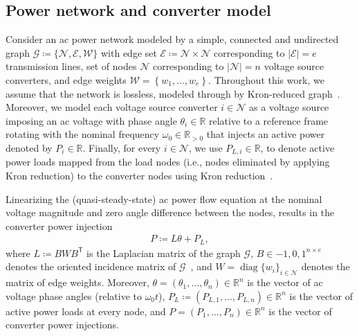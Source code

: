 \documentclass[twocolumn,twoside,journal]{IEEEtran}
\DeclareMathOperator{\diag}{diag}
\newcommand{\mc}{\mathcal}
\begin{document}
    \subsection{Power network and converter model}
    Consider an ac power network modeled by a simple, connected and undirected graph $\mathcal{G}\coloneqq \{\mathcal{N}, \mathcal{E}, \mathcal{W}\}$ with edge set $\mathcal{E}\coloneqq\mathcal{N}\times\mathcal{N}$ corresponding to $|\mathcal{E}|=e$ transmission lines, set of nodes $\mathcal{N}$ corresponding to $|\mathcal{N}|=n$ voltage source converters, and edge weights $\mathcal{W}=\left\{w_1, \ldots, w_e\right\}$. Throughout this work, we assume that the network is lossless, modeled through by Kron-reduced graph~\cite{DB2013}. Moreover, we model each voltage source converter $i \in \mathcal{N}$ as a voltage source imposing an ac voltage with phase angle $\theta_i \in \mathbb{R}$ relative to a reference frame rotating with the nominal frequency $\omega_0 \in \mathbb{R}_{>0}$ that injects an active power denoted by $P_i \in \mathbb{R}$. Finally, for every $i \in \mathcal{N}$, we use $P_{L, i} \in \mathbb{R}$, to denote active power loads mapped from the load nodes (i.e., nodes eliminated by applying Kron reduction) to the converter nodes using Kron reduction~\cite{DB2013}.
    
    Linearizing the (quasi-steady-state) ac power flow equation at the nominal voltage magnitude and zero angle difference between the nodes, results in the converter power injection
    \begin{align*}\label{eq:dcpfeq}
        P \coloneqq L\theta + P_{L}, 
    \end{align*}
    where $L\coloneqq BWB^\mathsf{T}$ is the Laplacian matrix of the graph $\mc G$, $B \in {-1,0,1}^{n \times e}$ denotes the oriented incidence matrix of $\mc G$~\cite{LNS}, and $W=\diag\{w_i\}_{i\in\mc N}$ denotes the matrix of edge weights. Moreover, $\theta = \left(\theta_1, \ldots, \theta_n\right) \in \mathbb{R}^n$ is the vector of ac voltage phase angles (relative to $\omega_0 t$), $P_{L} \coloneqq \left(P_{L,1}, \ldots, P_{L, n}\right) \in \mathbb{R}^n$ is the vector of active power loads at every node, and $P = \left(P_1, \ldots, P_n\right) \in \mathbb{R}^n$ is the vector of converter power injections.
\end{document}
